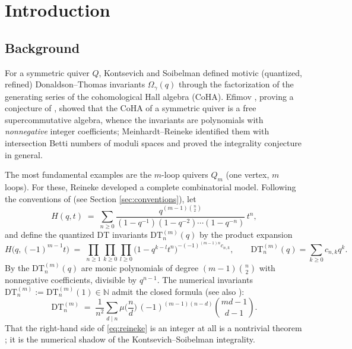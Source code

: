 \documentclass[11pt]{amsart}
\theoremstyle{definition}
\newcommand{\NN}{\mathbb{N}}
\newcommand{\DT}{\mathrm{DT}}
\begin{document}
\maketitle
\tableofcontents

\section{Introduction}

\subsection{Background}
For a symmetric quiver $Q$, Kontsevich and Soibelman \cite{KS} defined motivic (quantized, refined) Donaldson--Thomas invariants $\Omega_\gamma(q)$ through the factorization of the generating series of the cohomological Hall algebra (CoHA). Efimov \cite{Efimov}, proving a conjecture of \cite{KS}, showed that the CoHA of a symmetric quiver is a free supercommutative algebra, whence the invariants are polynomials with \emph{nonnegative} integer coefficients; Meinhardt--Reineke \cite{MR} identified them with intersection Betti numbers of moduli spaces and proved the integrality conjecture in general.

The most fundamental examples are the $m$-loop quivers $Q_m$ (one vertex, $m$ loops). For these, Reineke \cite{Rei0903, Rei1102} developed a complete combinatorial model. Following the conventions of \cite{Rei1102} (see Section \ref{sec:conventions}), let
\begin{equation}\label{eq:H}
H(q,t)\;=\;\sum_{n\ge 0}\frac{q^{(m-1)\binom n2}}{(1-q^{-1})(1-q^{-2})\cdots(1-q^{-n})}\,t^n ,
\end{equation}
and define the quantized DT invariants $\DT^{(m)}_n(q)$ by the product expansion
\begin{equation}\label{eq:proddef}
H\big(q,(-1)^{m-1}t\big)\;=\;\prod_{n\ge1}\prod_{k\ge0}\prod_{l\ge 0}\big(1-q^{k-l}t^n\big)^{-(-1)^{(m-1)n}c_{n,k}},
\qquad \DT^{(m)}_n(q)=\sum_{k\ge0}c_{n,k}q^k .
\end{equation}
By \cite{KS,Efimov,Rei1102} the $\DT^{(m)}_n(q)$ are monic polynomials of degree $(m-1)\binom n2$ with nonnegative coefficients, divisible by $q^{n-1}$. The numerical invariants $\DT^{(m)}_n:=\DT^{(m)}_n(1)\in\NN$ admit the closed formula \cite[Thm.~3.2]{Rei1102} (see also \cite[Ex.~2.4]{ReiSurvey}):
\begin{equation}\label{eq:reineke}
\DT^{(m)}_n \;=\; \frac{1}{n^2}\sum_{d\mid n}\mu\Big(\frac nd\Big)\,(-1)^{(m-1)(n-d)}\binom{md-1}{d-1}.
\end{equation}
That the right-hand side of \eqref{eq:reineke} is an integer at all is a nontrivial theorem \cite{Rei0903}; it is the numerical shadow of the Kontsevich--Soibelman integrality.
\end{document}

